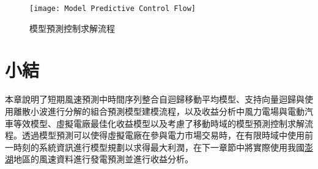 \begin{figure}[htbp]
  \centering
  \texttt{[image: Model Predictive Control Flow]}
  \caption{模型預測控制求解流程}
  \label{figure: Model Predictive Control Flow}
\end{figure}

\section{小結}

本章說明了短期風速預測中時間序列整合自迴歸移動平均模型、支持向量迴歸與使用離散小波進行分解的組合預測模型建模流程，以及收益分析中風力電場與電動汽車等效模型、虛擬電廠最佳化收益模型以及考慮了移動時域的模型預測控制求解流程。透過模型預測可以使得虛擬電廠在參與電力市場交易時，在有限時域中使用前一時刻的系統資訊進行模型規劃以求得最大利潤，在下一章節中將實際使用我國\uline{澎湖}地區的風速資料進行發電預測並進行收益分析。
